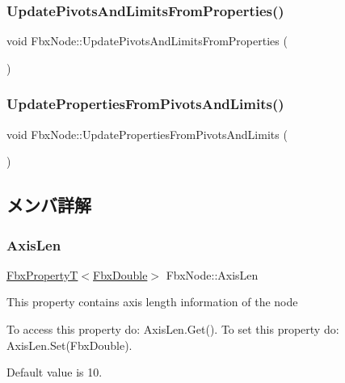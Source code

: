 \subsubsection{\texorpdfstring{Update\+Pivots\+And\+Limits\+From\+Properties()}{UpdatePivotsAndLimitsFromProperties()}}
{\footnotesize\ttfamily void Fbx\+Node\+::\+Update\+Pivots\+And\+Limits\+From\+Properties (\begin{DoxyParamCaption}{ }\end{DoxyParamCaption})}

\mbox{\label{class_fbx_node_a8f9a4276b6237074f41006e4562ac014}} 
\subsubsection{\texorpdfstring{Update\+Properties\+From\+Pivots\+And\+Limits()}{UpdatePropertiesFromPivotsAndLimits()}}
{\footnotesize\ttfamily void Fbx\+Node\+::\+Update\+Properties\+From\+Pivots\+And\+Limits (\begin{DoxyParamCaption}{ }\end{DoxyParamCaption})}



\subsection{メンバ詳解}
\mbox{\label{class_fbx_node_a8b54074cd906df334d5d6d0cc9756223}} 
\subsubsection{\texorpdfstring{Axis\+Len}{AxisLen}}
{\footnotesize\ttfamily \hyperlink{class_fbx_property_t}{Fbx\+PropertyT}$<$\hyperlink{fbxtypes_8h_a171e72a1c46fc15c1a6c9c31948c1c5b}{Fbx\+Double}$>$ Fbx\+Node\+::\+Axis\+Len}

This property contains axis length information of the node

To access this property do\+: Axis\+Len.\+Get(). To set this property do\+: Axis\+Len.\+Set(\+Fbx\+Double).

Default value is 10. 

